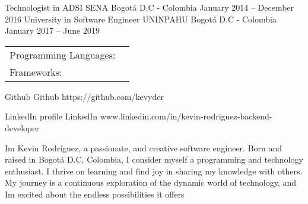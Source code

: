 \documentclass[]{awesome-cv}
\begin{document}
\begin{cventries}
	\cventry
	{Technologist in ADSI}
	{SENA}
	{Bogotá D.C - Colombia}
	{January 2014 – December 2016}
	{}
	\cventry
	{University in Software Engineer}
	{UNINPAHU}
	{Bogotá D.C - Colombia}
	{January 2017 – June 2019}
	{}
\end{cventries}

\vspace{-2mm}
\begin{cventries}
	\cventry
	{}
	{\def\arraystretch{1.15}{\begin{tabular}{ l l }
		Programming Languages:  & {\skill{ Python, Javscript, Ruby}} \\
		Frameworks:  & {\skill{ Django, FastAPI, Django REST framework, Flask, Vue JS, Ruby on Rails}} \\
		\end{tabular}}}
	{}
	{}
	{}
\end{cventries}

\vspace{-7mm}
\begin{cventries}
	\cventry
	{Github}
	{Github}
	{}
	{https://github.com/kevyder}
	{}
	
	\vspace{-5mm}
	\cventry
	{LinkedIn profile}
	{LinkedIn}
	{}
	{www.linkedin.com/in/kevin-rodriguez-backend-developer}
	{}
	
	\vspace{-5mm}
\end{cventries}
\begin{cvhonors}
	\cvhonor
	{I\textquotesingle{}m Kevin Rodríguez, a passionate, and creative software engineer. Born and raised in Bogotá D.C, Colombia, I consider myself a programming and technology enthusiast. I thrive on learning and find joy in sharing my knowledge with others. My journey is a continuous exploration of the dynamic world of technology, and I\textquotesingle{}m excited about the endless possibilities it offers}
	{}
	{}
	{}
\end{cvhonors}
\ 
\end{document}
